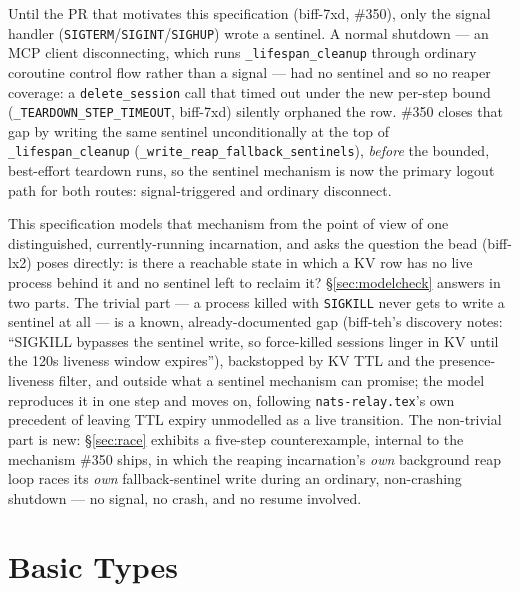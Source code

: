 \documentclass[a4paper,10pt,fleqn]{article}
\begin{document}
Until the PR that motivates this specification (biff-7xd, \#350), only
the signal handler (\texttt{SIGTERM}/\texttt{SIGINT}/\texttt{SIGHUP})
wrote a sentinel.  A normal shutdown --- an MCP client disconnecting,
which runs \texttt{\_lifespan\_cleanup} through ordinary coroutine
control flow rather than a signal --- had no sentinel and so no reaper
coverage: a \texttt{delete\_session} call that timed out under the new
per-step bound (\texttt{\_TEARDOWN\_STEP\_TIMEOUT}, biff-7xd) silently
orphaned the row.  \#350 closes that gap by writing the same sentinel
unconditionally at the top of \texttt{\_lifespan\_cleanup}
(\texttt{\_write\_reap\_fallback\_sentinels}), \emph{before} the bounded,
best-effort teardown runs, so the sentinel mechanism is now the primary
logout path for both routes: signal-triggered and ordinary disconnect.

This specification models that mechanism from the point of view of one
distinguished, currently-running incarnation, and asks the question the
bead (biff-lx2) poses directly: is there a reachable state in which a
KV row has no live process behind it and no sentinel left to reclaim
it?  \S\ref{sec:modelcheck} answers in two parts.  The trivial part ---
a process killed with \texttt{SIGKILL} never gets to write a sentinel
at all --- is a known, already-documented gap (biff-teh's discovery
notes: ``SIGKILL bypasses the sentinel write, so force-killed sessions
linger in KV until the 120s liveness window expires''), backstopped by
KV TTL and the presence-liveness filter, and outside what a sentinel
mechanism can promise; the model reproduces it in one step and moves
on, following \texttt{nats-relay.tex}'s own precedent of leaving TTL
expiry unmodelled as a live transition.  The non-trivial part is new:
\S\ref{sec:race} exhibits a five-step counterexample, internal to the
mechanism \#350 ships, in which the reaping incarnation's \emph{own}
background reap loop races its \emph{own} fallback-sentinel write
during an ordinary, non-crashing shutdown --- no signal, no crash, and
no resume involved.

\section{Basic Types}

\begin{zed}
  [SESSIONKEY]
\end{zed}
\end{document}
